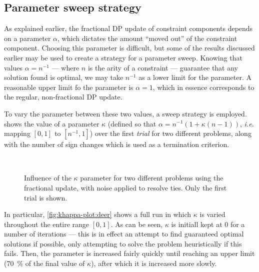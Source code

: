 \subsection{Parameter sweep strategy}
As explained earlier, the fractional DP update of constraint components depends on a parameter \(\alpha\), which dictates the amount \enquote{moved out} of the constraint component.
Choosing this parameter is difficult, but some of the results discussed earlier may be used to create a strategy for a parameter sweep.
Knowing that values \(\alpha=n^{-1}\) --- where \(n\) is the arity of a constraint --- guarantee that any solution found is optimal, we may take \(n^{-1}\) as a lower limit for the parameter.
A reasonable upper limit fo the parameter is \(\alpha=1\), which in essence corresponds to the regular, non-fractional DP update.

To vary the parameter between these two values, a sweep strategy is employed.
 shows the value of a parameter \(\kappa\) (defined so that \(\alpha = n^{-1}\left(1 + \kappa(n - 1)\right)\), \emph{i.e.} mapping \(\left[0,1\right]\) to \(\left[n^{-1},1\right]\)) over the first \emph{trial} for two different problems, along with the number of sign changes which is used as a termination criterion.

\begin{figure}[p]
	\centering
	\\
	\caption{Influence of the \(\kappa\) parameter for two different problems using the fractional update, with noise applied to resolve ties. Only the first trial is shown.}
	\label{fig:khappa-plot}
\end{figure}

In particular, \cref{fig:khappa-plot:deer} shows a full run in which \(\kappa\) is varied throughout the entire range \([0,1]\).
As can be seen, \(\kappa\) is initiall kept at 0 for a number of iterations --- this is in effect an attempt to find guaranteed optimal solutions if possible, only attempting to solve the problem heuristically if this fails.
Then, the parameter is increased fairly quickly until reaching an upper limit (\SI{70}{\percent} of the final value of \(\kappa\)), after which it is increased more slowly.

